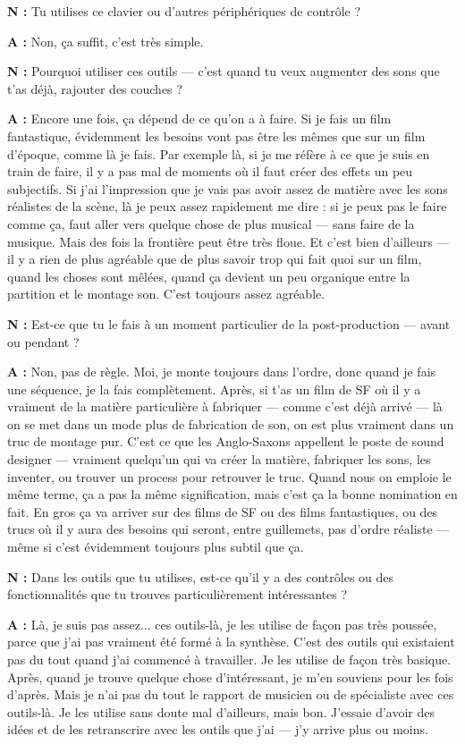 ﻿\documentclass[12pt]{article}
\begin{document}
\textbf{N :} Tu utilises ce clavier ou d'autres périphériques de contrôle ? 

\textbf{A :} Non, ça suffit, c'est très simple. 

\textbf{N :} Pourquoi utiliser ces outils — c'est quand tu veux augmenter des sons que t'as déjà, rajouter des couches ? 

\textbf{A :} Encore une fois, ça dépend de ce qu'on a à faire. Si je fais un film fantastique, évidemment les besoins vont pas être les mêmes que sur un film d'époque, comme là je fais. Par exemple là, si je me réfère à ce que je suis en train de faire, il y a pas mal de moments où il faut créer des effets un peu subjectifs. Si j'ai l'impression que je vais pas avoir assez de matière avec les sons réalistes de la scène, là je peux assez rapidement me dire : si je peux pas le faire comme ça, faut aller vers quelque chose de plus musical — sans faire de la musique. Mais des fois la frontière peut être très floue. Et c'est bien d'ailleurs — il y a rien de plus agréable que de plus savoir trop qui fait quoi sur un film, quand les choses sont mêlées, quand ça devient un peu organique entre la partition et le montage son. C'est toujours assez agréable. 

\textbf{N :} Est-ce que tu le fais à un moment particulier de la post-production — avant ou pendant ? 

\textbf{A :} Non, pas de règle. Moi, je monte toujours dans l'ordre, donc quand je fais une séquence, je la fais complètement. Après, si t'as un film de SF où il y a vraiment de la matière particulière à fabriquer — comme c'est déjà arrivé — là on se met dans un mode plus de fabrication de son, on est plus vraiment dans un truc de montage pur. C'est ce que les Anglo-Saxons appellent le poste de sound designer — vraiment quelqu'un qui va créer la matière, fabriquer les sons, les inventer, ou trouver un process pour retrouver le truc. Quand nous on emploie le même terme, ça a pas la même signification, mais c'est ça la bonne nomination en fait. En gros ça va arriver sur des films de SF ou des films fantastiques, ou des trucs où il y aura des besoins qui seront, entre guillemets, pas d'ordre réaliste — même si c'est évidemment toujours plus subtil que ça. 

\textbf{N :} Dans les outils que tu utilises, est-ce qu'il y a des contrôles ou des fonctionnalités que tu trouves particulièrement intéressantes ? 

\textbf{A :} Là, je suis pas assez... ces outils-là, je les utilise de façon pas très poussée, parce que j'ai pas vraiment été formé à la synthèse. C'est des outils qui existaient pas du tout quand j'ai commencé à travailler. Je les utilise de façon très basique. Après, quand je trouve quelque chose d'intéressant, je m'en souviens pour les fois d'après. Mais je n'ai pas du tout le rapport de musicien ou de spécialiste avec ces outils-là. Je les utilise sans doute mal d'ailleurs, mais bon. J'essaie d'avoir des idées et de les retranscrire avec les outils que j'ai — j'y arrive plus ou moins. 
\end{document}
